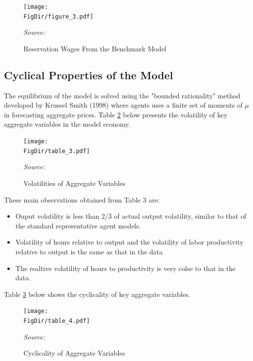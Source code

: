 \documentclass[titlepage,letterpaper]{\econtex}
\begin{document}
     \begin{figure}[ht]
    {\centering \texttt{[image: \\FigDir/figure\_3.pdf]}}
    \caption{Reservation Wages From the Benchmark Model}
    \footnotesize {{\emph{Source:}} {\citet{changkim2007}}}
    \label{fig:figure_3}
  \end{figure}


\subsection{Cyclical Properties of the Model}\label{sec:CyclicalProperties}

The equilibrium of the model is solved using the "bounded rationality" method developed by Krussel Smith (1998) where agents uses a finite set of moments of $\mu$ in forecasting aggregate prices. Table \ref{fig:table_3}  below presents the volatility of key aggregate variables in the model economy.

       \begin{figure}[ht]
    {\centering \texttt{[image: \\FigDir/table\_3.pdf]}}
    \caption{Volatilities of Aggregate Variables}
    \footnotesize {{\emph{Source:}} {\citet{changkim2007}}}
    \label{fig:table_3}
  \end{figure}
  

These main observations obtained from Table 3 are:
\begin{itemize}
\item Ouput volatility is less than 2/3 of actual output volatility, similar to that of the standard representative agent models.
\item Volatility of hours relative to output and the volatility of labor productivity relative to output is the same as that in the data
\item The realtive volatility of hours to productivity is very colse to that in the data.
\end{itemize}

Table \ref{fig:table_4}  below shows the cyclicality of key aggregate variables.

       \begin{figure}[ht]
    {\centering \texttt{[image: \\FigDir/table\_4.pdf]}}
    \caption{Cyclicality of Aggregate Variables}
    \footnotesize {{\emph{Source:}} {\citet{changkim2007}}}
    \label{fig:table_4}
  \end{figure}
  
\end{document}
